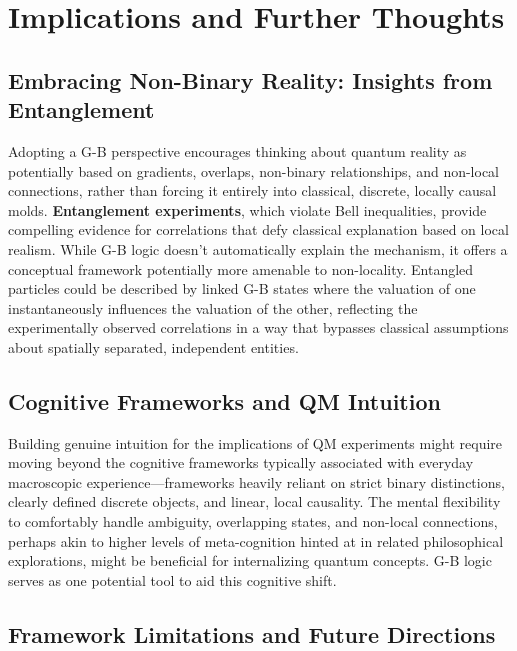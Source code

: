 \documentclass{article}
\begin{document}
\section{Implications and Further Thoughts}

\subsection{Embracing Non-Binary Reality: Insights from Entanglement}

Adopting a G-B perspective encourages thinking about quantum reality as potentially based on gradients, overlaps, non-binary relationships, and non-local connections, rather than forcing it entirely into classical, discrete, locally causal molds. \textbf{Entanglement experiments}, which violate Bell inequalities, provide compelling evidence for correlations that defy classical explanation based on local realism. While G-B logic doesn't automatically explain the mechanism, it offers a conceptual framework potentially more amenable to non-locality. Entangled particles could be described by linked G-B states where the valuation of one instantaneously influences the valuation of the other, reflecting the experimentally observed correlations in a way that bypasses classical assumptions about spatially separated, independent entities.

\subsection{Cognitive Frameworks and QM Intuition}

Building genuine intuition for the implications of QM experiments might require moving beyond the cognitive frameworks typically associated with everyday macroscopic experience---frameworks heavily reliant on strict binary distinctions, clearly defined discrete objects, and linear, local causality. The mental flexibility to comfortably handle ambiguity, overlapping states, and non-local connections, perhaps akin to higher levels of meta-cognition hinted at in related philosophical explorations, might be beneficial for internalizing quantum concepts. G-B logic serves as one potential tool to aid this cognitive shift.

\subsection{Framework Limitations and Future Directions}
\end{document}
